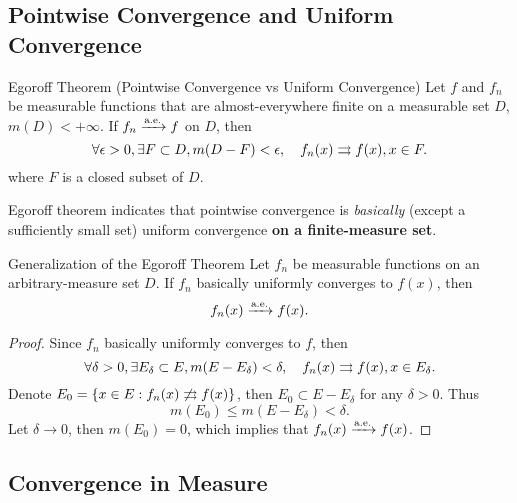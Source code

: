 \subsection{Pointwise Convergence and Uniform Convergence}

\begin{theorem}{Egoroff Theorem (Pointwise Convergence vs Uniform Convergence)}{}
  Let $f$ and $f_n$ be measurable functions that are almost-everywhere finite
  on a measurable set $D$, $m(D) < +\infty$.
  If $f_n \xrightarrow{\text{a.e.}} f$ on $D$,
  then
  \begin{equation}
    \forall \epsilon > 0, \exists F \subset D, m(D - F) < \epsilon, \quad
    f_n(x) \rightrightarrows f(x), x \in F.
  \end{equation}
  where $F$ is a closed subset of $D$.
\end{theorem}

\begin{note}
  Egoroff theorem indicates that pointwise convergence is
  \emph{basically} (except a sufficiently small set) uniform convergence
  \textbf{on a finite-measure set}.
\end{note}

\begin{example}{Generalization of the Egoroff Theorem}{}
  Let $f_n$ be measurable functions on an arbitrary-measure set $D$.
  If $f_n$ basically uniformly converges to $f(x)$, then
  \begin{equation}
    f_n(x) \xrightarrow{\text{a.e.}} f(x).
  \end{equation}
\end{example}

\begin{proof}
  Since $f_n$ basically uniformly converges to $f$, then
  \begin{equation}
    \forall \delta > 0, \exists E_{\delta} \subset E, m(E - E_{\delta}) < \delta,
    \quad f_n(x) \rightrightarrows f(x), x \in E_{\delta}.
  \end{equation}
  Denote $E_0 = \{x \in E: f_n(x) \not \rightrightarrows f(x)\}$, then $E_0 \subset E - E_{\delta}$ for any $\delta > 0$.
  Thus
  \begin{equation}
    m(E_0) \leq m(E - E_{\delta}) < \delta.
  \end{equation}
  Let $\delta \rightarrow 0$, then $m(E_0) = 0$, which implies that $f_n(x) \xrightarrow{\text{a.e.}} f(x)$.
\end{proof}

\subsection{Convergence in Measure}

